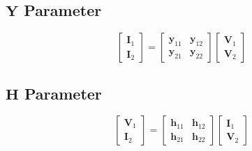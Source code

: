 	\subsection*{$\mathbf{Y}$ Parameter} \label{subsec:Y Parameter}
		\begin{equation*} \label{eq:Y Parameter}
			\begin{bmatrix}
				\mathbf{I}_{1} \\
				\mathbf{I}_{2} 
			\end{bmatrix}
			=\begin{bmatrix}
				\mathbf{y}_{11} & \mathbf{y}_{12} \\
				\mathbf{y}_{21} & \mathbf{y}_{22}
			\end{bmatrix}
			\begin{bmatrix}
				\mathbf{V}_{1} \\
				\mathbf{V}_{2} 
			\end{bmatrix}
		\end{equation*}
	
	\vspace{-4mm}	
	\subsection*{$\mathbf{H}$ Parameter} \label{subsec:H Parameter}
		\begin{equation*} \label{eq:H Parameter}
			\begin{bmatrix}
				\mathbf{V}_{1} \\
				\mathbf{I}_{2} 
			\end{bmatrix}
			=\begin{bmatrix}
				\mathbf{h}_{11} & \mathbf{h}_{12} \\
				\mathbf{h}_{21} & \mathbf{h}_{22}
			\end{bmatrix}
			\begin{bmatrix}
				\mathbf{I}_{1} \\
				\mathbf{V}_{2} 
			\end{bmatrix}
		\end{equation*}

	
